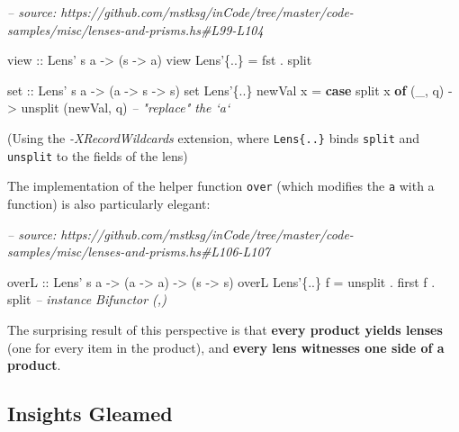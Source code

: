 \documentclass[]{article}
\newenvironment{Shaded}{}{}
\newcommand{\CommentTok}[1]{\textcolor[rgb]{0.38,0.63,0.69}{\textit{#1}}}
\newcommand{\DataTypeTok}[1]{\textcolor[rgb]{0.56,0.13,0.00}{#1}}
\newcommand{\FunctionTok}[1]{\textcolor[rgb]{0.02,0.16,0.49}{#1}}
\newcommand{\KeywordTok}[1]{\textcolor[rgb]{0.00,0.44,0.13}{\textbf{#1}}}
\newcommand{\NormalTok}[1]{#1}
\newcommand{\OtherTok}[1]{\textcolor[rgb]{0.00,0.44,0.13}{#1}}
\begin{document}
\begin{Shaded}
\begin{Highlighting}[]
\CommentTok{-- source: https://github.com/mstksg/inCode/tree/master/code-samples/misc/lenses-and-prisms.hs#L99-L104}

\OtherTok{view ::} \DataTypeTok{Lens'}\NormalTok{ s a }\OtherTok{->}\NormalTok{ (s }\OtherTok{->}\NormalTok{ a)}
\NormalTok{view }\DataTypeTok{Lens'}\NormalTok{\{}\FunctionTok{..}\NormalTok{\} }\FunctionTok{=}\NormalTok{ fst }\FunctionTok{.}\NormalTok{ split}

\OtherTok{set ::} \DataTypeTok{Lens'}\NormalTok{ s a }\OtherTok{->}\NormalTok{ (a }\OtherTok{->}\NormalTok{ s }\OtherTok{->}\NormalTok{ s)}
\NormalTok{set }\DataTypeTok{Lens'}\NormalTok{\{}\FunctionTok{..}\NormalTok{\} newVal x }\FunctionTok{=} \KeywordTok{case}\NormalTok{ split x }\KeywordTok{of}
\NormalTok{    (_, q) }\OtherTok{->}\NormalTok{ unsplit (newVal, q)      }\CommentTok{-- "replace" the `a`}
\end{Highlighting}
\end{Shaded}

(Using the \emph{-XRecordWildcards} extension, where
\texttt{Lens\textquotesingle{}\{..\}} binds \texttt{split} and \texttt{unsplit}
to the fields of the lens)

The implementation of the helper function \texttt{over} (which modifies the
\texttt{a} with a function) is also particularly elegant:

\begin{Shaded}
\begin{Highlighting}[]
\CommentTok{-- source: https://github.com/mstksg/inCode/tree/master/code-samples/misc/lenses-and-prisms.hs#L106-L107}

\OtherTok{overL ::} \DataTypeTok{Lens'}\NormalTok{ s a }\OtherTok{->}\NormalTok{ (a }\OtherTok{->}\NormalTok{ a) }\OtherTok{->}\NormalTok{ (s }\OtherTok{->}\NormalTok{ s)}
\NormalTok{overL }\DataTypeTok{Lens'}\NormalTok{\{}\FunctionTok{..}\NormalTok{\}  f }\FunctionTok{=}\NormalTok{ unsplit }\FunctionTok{.}\NormalTok{ first f }\FunctionTok{.}\NormalTok{ split   }\CommentTok{-- instance Bifunctor (,)}
\end{Highlighting}
\end{Shaded}

The surprising result of this perspective is that \textbf{every product yields
lenses} (one for every item in the product), and \textbf{every lens witnesses
one side of a product}.

\hypertarget{insights-gleamed}{%
\subsection{Insights Gleamed}\label{insights-gleamed}}
\end{document}
